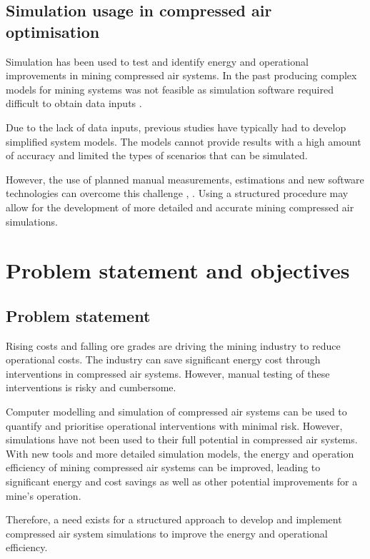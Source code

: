 	\subsection{Simulation usage in compressed air optimisation}
		Simulation has been used to test and identify energy and operational improvements in mining compressed air systems. In the past producing complex models for mining systems was not feasible as simulation software required difficult to obtain data inputs \cite{marais2013simplification}. 
		\par 
		Due to the lack of data inputs, previous studies have typically had to develop simplified system models. The models cannot provide results with a high amount of accuracy and limited the types of scenarios that can be simulated. 
		\par 
		However, the use of planned manual measurements, estimations and new software technologies can overcome this challenge \cite{Bredenkamp2015Challeges}, \cite{Mare2017Evaluating}. Using a structured procedure may allow for the development of more detailed and accurate mining compressed air simulations.
		

\section{Problem statement and objectives}
	\subsection{Problem statement}
 		Rising costs and falling ore grades are driving the mining industry to reduce operational costs. The industry can save significant energy cost through interventions in compressed air systems. However, manual testing of these interventions is risky and cumbersome.
 		\par
 		Computer modelling and simulation of compressed air systems can be used to quantify and prioritise operational interventions with minimal risk. However, simulations have not been used to their full potential in compressed air systems. With new tools and more detailed simulation models, the energy and operation efficiency of mining compressed air systems can be improved, leading to significant energy and cost savings as well as other potential improvements for a mine's operation.
 		\par 
 		Therefore, a need exists for a structured approach to develop and implement compressed air system simulations to improve the energy and operational efficiency.
